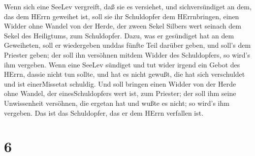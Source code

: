  Wenn sich eine SeeLev vergreift, daß sie es versiehet, und
sichversündiget an dem, das dem HErrn geweihet ist, soll sie ihr
Schuldopfer dem HErrnbringen, einen Widder ohne Wandel von der Herde,
der zween Sekel Silbers wert seinach dem Sekel des Heiligtums, zum
Schuldopfer.  Dazu, was er gesündiget hat an dem
Geweiheten, soll er wiedergeben unddas fünfte Teil darüber geben, und
soll's dem Priester geben; der soll ihn versöhnen mitdem Widder des
Schuldopfers, so wird's ihm vergeben.  Wenn eine SeeLev
sündiget und tut wider irgend ein Gebot des HErrn, dassie nicht tun
sollte, und hat es nicht gewußt, die hat sich verschuldet und ist
einerMissetat schuldig.  Und soll bringen einen Widder von
der Herde ohne Wandel, der einesSchuldopfers wert ist, zum Priester; der
soll ihm seine Unwissenheit versöhnen, die ergetan hat und wußte es
nicht; so wird's ihm vergeben.  Das ist das Schuldopfer,
das er dem HErrn verfallen ist.

\hypertarget{section-5}{%
\section{6}\label{section-5}}

